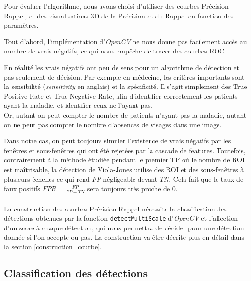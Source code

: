 \documentclass[a4paper,11pt]{article}
\begin{document}
        Pour évaluer l'algorithme, nous avons choisi d'utiliser des courbes Précision-Rappel, et des visualisations 3D de la Précision et du Rappel en fonction des paramètres.

        Tout d'abord, l'implémentation d'{\it OpenCV} ne nous donne pas facilement accès au nombre de vrais négatifs, ce qui nous empêche de tracer des courbes ROC. 
        
        En réalité les vrais négatifs ont peu de sens pour un algorithme de détection et pas seulement de décision.
        Par exemple en médecine, les critères importants sont la sensibilité ({\it sensitivity} en anglais) et la spécificité. Il s'agit simplement des True Positive Rate et True Negative Rate, afin d'identifier correctement les patients ayant la maladie, et identifier ceux ne l'ayant pas.\\
        Or, autant on peut compter le nombre de patients n'ayant pas la maladie, autant on ne peut pas compter le nombre d'absences de visages dans une image.

        Dans notre cas, on peut toujours simuler l'existence de vrais négatifs par les fenêtres et sous-fenêtres qui ont été rejetées par la cascade de features. Toutefois, contrairement à la méthode étudiée pendant le premier TP où le nombre de ROI est maîtrisable, la détection de Viola-Jones utilise des ROI et des sous-fenêtres à plusieurs échelles ce qui rend $FP$ négligeable devant $TN$.
        Cela fait que le taux de faux positifs $FPR = \frac{FP}{FP+TN}$ sera toujours très proche de $0$.\\\\
        La construction des courbes Précision-Rappel nécessite la classification des détections obtenues par la fonction \verb!detectMultiScale! d'{\it OpenCV} et l'affection d'un score à chaque détection, qui nous permettra de décider pour une détection donnée si l'on accepte ou pas. La construction va être décrite plus en détail dans la section  \ref{construction_courbe}.
        
    \subsection{Classification des détections}
        
\end{document}
